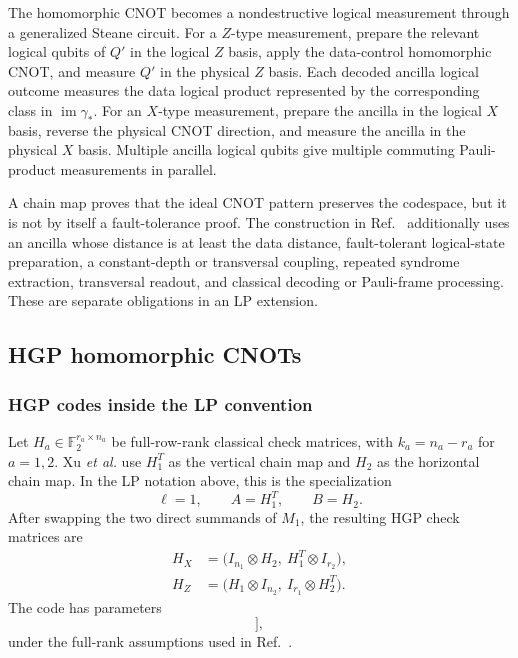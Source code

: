 \documentclass[11pt]{article}
\newcommand{\F}{\mathbb{F}}
\newcommand{\im}{\operatorname{im}}
\begin{document}
The homomorphic CNOT becomes a nondestructive logical measurement through a
generalized Steane circuit. For a $Z$-type measurement, prepare the relevant
logical qubits of $Q'$ in the logical $Z$ basis, apply the data-control
homomorphic CNOT, and measure $Q'$ in the physical $Z$ basis. Each decoded
ancilla logical outcome measures the data logical product represented by the
corresponding class in $\im\gamma_*$. For an $X$-type measurement, prepare
the ancilla in the logical $X$ basis, reverse the physical CNOT direction, and
measure the ancilla in the physical $X$ basis. Multiple ancilla logical
qubits give multiple commuting Pauli-product measurements in parallel.

A chain map proves that the ideal CNOT pattern preserves the codespace, but it
is not by itself a fault-tolerance proof. The construction in
Ref.~\cite{XuEtAl2024} additionally uses an ancilla whose distance is at least
the data distance, fault-tolerant logical-state preparation, a constant-depth
or transversal coupling, repeated syndrome extraction, transversal readout,
and classical decoding or Pauli-frame processing. These are separate
obligations in an LP extension.

\subsection{HGP homomorphic CNOTs}

\subsubsection{HGP codes inside the LP convention}

Let $H_a\in\F_2^{r_a\times n_a}$ be full-row-rank classical check matrices,
with $k_a=n_a-r_a$ for $a=1,2$. Xu \emph{et al.} use $H_1^T$ as the vertical
chain map and $H_2$ as the horizontal chain map. In the LP notation above,
this is the specialization
\begin{equation}
  \ell=1,
  \qquad
  A=H_1^T,
  \qquad
  B=H_2.
  \label{eq:hgp-lp-translation}
\end{equation}
After swapping the two direct summands of $M_1$, the resulting HGP check
matrices are
\begin{align}
  H_X&=\bigl(I_{n_1}\otimes H_2,\ H_1^T\otimes I_{r_2}\bigr),
  \label{eq:hgp-hx}\\
  H_Z&=\bigl(H_1\otimes I_{n_2},\ I_{r_1}\otimes H_2^T\bigr).
  \label{eq:hgp-hz}
\end{align}
The code has parameters
\begin{equation}
  [[n_1n_2+r_1r_2,\ k_1k_2,\ \min(d_1,d_2)]],
  \label{eq:hgp-parameters}
\end{equation}
under the full-rank assumptions used in Ref.~\cite{XuEtAl2024}.
\end{document}
